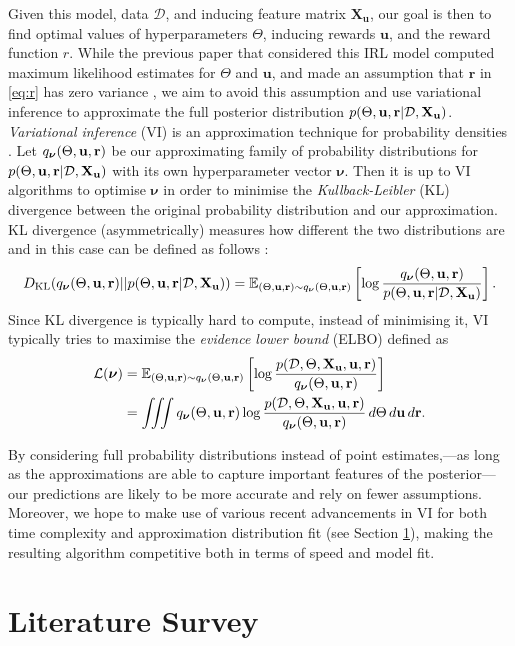 \documentclass{mprop}
\theoremstyle{definition}
\begin{document}
Given this model, data $\mathcal{D}$, and inducing feature matrix
$\mathbf{X_u}$, our goal is then to find optimal values of hyperparameters
$\Theta$, inducing rewards $\mathbf{u}$, and the reward function $r$. While the
previous paper that considered this IRL model computed maximum likelihood estimates
for $\Theta$ and $\mathbf{u}$, and made an assumption that $\mathbf{r}$ in
\eqref{eq:r} has zero variance \cite{DBLP:conf/nips/LevinePK11}, we aim to
avoid this assumption and use variational inference to approximate the full
posterior distribution $p(\Theta, \mathbf{u}, \mathbf{r} | \mathcal{D}, \mathbf{X_u})$. \emph{Variational inference} (VI) is an
approximation technique for probability densities \cite{blei2017variational}.
Let $q_{\bm\nu}(\Theta, \mathbf{u}, \mathbf{r})$ be our approximating family of probability distributions
for $p(\Theta, \mathbf{u}, \mathbf{r} | \mathcal{D}, \mathbf{X_u})$ with its own hyperparameter vector $\bm\nu$. Then it is up
to VI algorithms to optimise $\bm\nu$ in order to minimise the
\emph{Kullback-Leibler} (KL) divergence between the original probability
distribution and our approximation.  KL divergence (asymmetrically) measures how
different the two distributions are and in this case can be defined as follows
\cite{blei2017variational}:
\[ D_{\mathrm{KL}}(q_{\bm\nu}(\Theta, \mathbf{u}, \mathbf{r}) || p(\Theta, \mathbf{u}, \mathbf{r} | \mathcal{D}, \mathbf{X_u})) = \mathbb{E}_{(\Theta, \mathbf{u}, \mathbf{r}) \sim q_{\bm\nu}(\Theta, \mathbf{u}, \mathbf{r})} \left[ \log
  \frac{q_{\bm\nu}(\Theta, \mathbf{u}, \mathbf{r})}{p(\Theta, \mathbf{u}, \mathbf{r} | \mathcal{D}, \mathbf{X_u})} \right]. \]
Since KL divergence is typically hard to compute, instead of minimising it, VI
typically tries to maximise the \emph{evidence lower bound} (ELBO) defined as
\cite{DBLP:books/lib/Bishop07,blei2017variational}
\begin{equation} \label{eq:elbo}
  \begin{split}
    \mathcal{L}(\bm\nu) &= \mathbb{E}_{(\Theta, \mathbf{u}, \mathbf{r}) \sim q_{\bm\nu}(\Theta, \mathbf{u}, \mathbf{r})} \left[ \log \frac{p(\mathcal{D}, \Theta, \mathbf{X_u}, \mathbf{u}, \mathbf{r})}{q_{\bm\nu}(\Theta, \mathbf{u}, \mathbf{r})}
    \right] \\
    &= \iiint q_{\bm\nu}(\Theta, \mathbf{u}, \mathbf{r}) \log
    \frac{p(\mathcal{D}, \Theta, \mathbf{X_u}, \mathbf{u}, \mathbf{r})}{q_{\bm\nu}(\Theta, \mathbf{u}, \mathbf{r})}\,d\Theta\,d\mathbf{u}\,d\mathbf{r}.
  \end{split}
\end{equation}

By considering full probability distributions instead of point estimates,---as
long as the approximations are able to capture important features of the
posterior---our predictions are likely to be more accurate and rely on fewer
assumptions. Moreover, we hope to make use of various recent advancements in VI
for both time complexity and approximation distribution fit (see Section
\ref{literature}), making the resulting algorithm competitive both in terms of
speed and model fit.

\section{Literature Survey} \label{literature}
\end{document}
